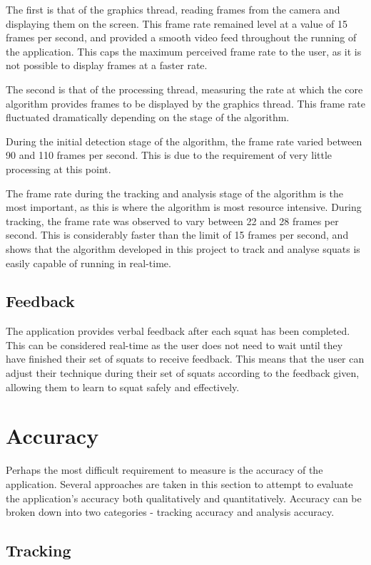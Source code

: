 The first is that of the graphics thread, reading frames from the camera and displaying them on the screen. This frame rate remained level at a value of 15 frames per second, and provided a smooth video feed throughout the running of the application. This caps the maximum perceived frame rate to the user, as it is not possible to display frames at a faster rate.

The second is that of the processing thread, measuring the rate at which the core algorithm provides frames to be displayed by the graphics thread. This frame rate fluctuated dramatically depending on the stage of the algorithm.

During the initial detection stage of the algorithm, the frame rate varied between 90 and 110 frames per second. This is due to the requirement of very little processing at this point.

The frame rate during the tracking and analysis stage of the algorithm is the most important, as this is where the algorithm is most resource intensive. During tracking, the frame rate was observed to vary between 22 and 28 frames per second. This is considerably faster than the limit of 15 frames per second, and shows that the algorithm developed in this project to track and analyse squats is easily capable of running in real-time.

\subsection{Feedback}
The application provides verbal feedback after each squat has been completed. This can be considered real-time as the user does not need to wait until they have finished their set of squats to receive feedback. This means that the user can adjust their technique during their set of squats according to the feedback given, allowing them to learn to squat safely and effectively.

\section{Accuracy}
Perhaps the most difficult requirement to measure is the accuracy of the application. Several approaches are taken in this section to attempt to evaluate the application's accuracy both qualitatively and quantitatively. Accuracy can be broken down into two categories - tracking accuracy and analysis accuracy.

\subsection{Tracking}

